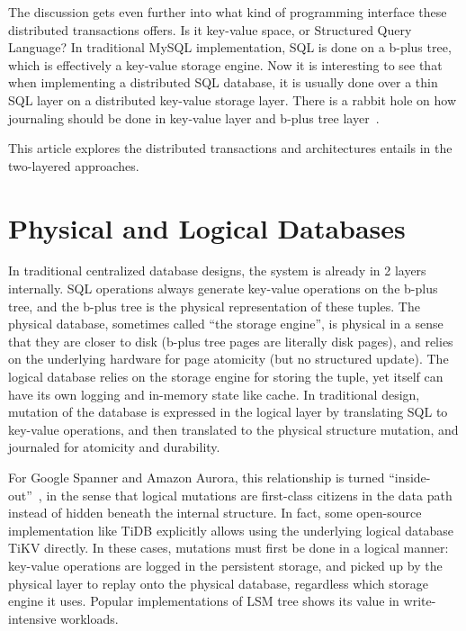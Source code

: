 The discussion gets even further into what kind of programming interface
these distributed transactions offers. Is it key-value space, or Structured
Query Language? In traditional MySQL implementation, SQL is done on a b-plus
tree, which is effectively a key-value storage engine. Now it is interesting
to see that when implementing a distributed SQL database, it is usually done
over a thin SQL layer on a distributed key-value storage layer. There is
a rabbit hole on how journaling should be done in key-value layer and b-plus
tree layer~\cite{gray1992transaction, sippu2015transaction}.

This article explores the distributed transactions and architectures entails
in the two-layered approaches.

\section{Physical and Logical Databases}
In traditional centralized database designs, the system is already in 2
layers internally. SQL operations always generate key-value operations on the
b-plus tree, and the b-plus tree is the physical representation of these
tuples. The physical database, sometimes called ``the storage engine'', is
physical in a sense that they are closer to disk (b-plus tree pages are
literally disk pages), and relies on the underlying hardware for page
atomicity (but no structured update). The logical database relies on the
storage engine for storing the tuple, yet itself can have its own logging and
in-memory state like cache. In traditional design, mutation of the database
is expressed in the logical layer by translating SQL to key-value operations, and
then translated to the physical structure mutation, and journaled for
atomicity and durability.

For Google Spanner and Amazon Aurora, this relationship is turned
``inside-out''~\cite{Cooper_2013, verbitski2017amazon}, in the sense that
logical mutations are first-class citizens in the data path instead of hidden
beneath the internal structure. In fact, some open-source implementation like
TiDB explicitly allows using the underlying logical database TiKV directly.
In these cases, mutations must first be done in a logical manner:
key-value operations are logged in the persistent storage, and picked up by
the physical layer to replay onto the physical database, regardless which
storage engine it uses. Popular implementations of LSM tree shows its value
in write-intensive workloads.


